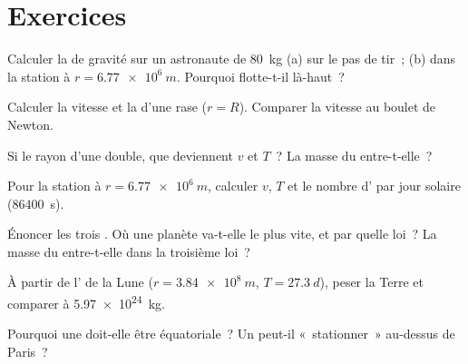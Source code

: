 \section{Exercices}


\begin{exercise}[$\star$]\label{exo:g12:satellites-kepler:1}
Calculer la  de gravité sur un astronaute de
\qty{80}{kg} (a) sur le pas de tir~; (b) dans la station à
$r = \qty{6.77e6}{m}$. Pourquoi flotte-t-il là-haut~?
\end{exercise}

\begin{exercise}[$\star$]\label{exo:g12:satellites-kepler:2}
Calculer la vitesse et la  d'une
 rase ($r = R$). Comparer la vitesse au
boulet de Newton.
\end{exercise}

\begin{exercise}[$\star$]\label{exo:g12:satellites-kepler:3}
Si le rayon d'une  double, que deviennent $v$
et $T$~? La masse du  entre-t-elle~?
\end{exercise}

\begin{exercise}[$\star$]\label{exo:g12:satellites-kepler:4}
Pour la station à $r = \qty{6.77e6}{m}$, calculer $v$, $T$ et le
nombre d' par jour solaire (\qty{86400}{s}).
\end{exercise}

\begin{exercise}[$\star$]\label{exo:g12:satellites-kepler:5}
Énoncer les trois . Où une planète va-t-elle le plus
vite, et par quelle loi~? La masse du
 entre-t-elle dans la troisième loi~?
\end{exercise}

\begin{exercise}[$\star\star$]\label{exo:g12:satellites-kepler:6}
À partir de l' de la Lune ($r = \qty{3.84e8}{m}$,
$T = \qty{27.3}{d}$), peser la Terre et comparer à
\qty{5.97e24}{kg}.
\end{exercise}

\begin{exercise}[$\star\star$]\label{exo:g12:satellites-kepler:7}
Pourquoi une  doit-elle être
équatoriale~? Un  peut-il «~stationner~» au-dessus de Paris~?
\end{exercise}

